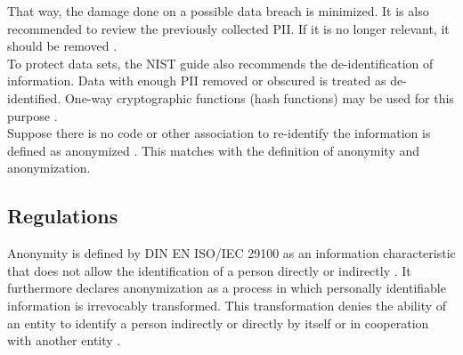         That way, the damage done on a possible data breach is minimized. It is also recommended to review the previously collected PII. If it is no longer relevant, it should be removed \cite{mccallister_guide_2010}.\\
        To protect data sets, the NIST guide also recommends the de-identification of information. Data with enough PII removed or obscured is treated as de-identified. One-way cryptographic functions (hash functions) may be used for this purpose \cite{mccallister_guide_2010}.\\
        Suppose there is no code or other association to re-identify the information is defined as anonymized \cite{mccallister_guide_2010}. This matches with the definition of anonymity and anonymization.


    \newpage
    \subsection{Regulations}
        \label{subsec:related:law}
        Anonymity is defined by DIN EN ISO/IEC 29100 as an information characteristic that does not allow the identification of a person directly or indirectly \cite{german_institute_for_standardization_din_2020}. It furthermore declares anonymization as a process in which personally identifiable information is irrevocably transformed. This transformation denies the ability of an entity to identify a person indirectly or directly by itself or in cooperation with another entity \cite{german_institute_for_standardization_din_2020}.\\
        
